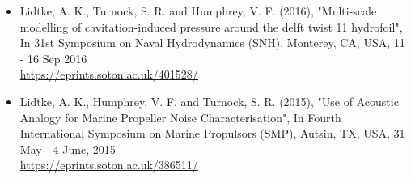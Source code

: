\documentclass[a4paper,10pt]{article}
\begin{document}
\begin{itemize}
%
\item Lidtke, A. K., Turnock, S. R. and Humphrey, V. F. (2016), "Multi-scale modelling
	of cavitation-induced pressure around the delft twist 11 hydrofoil",
	In 31st Symposium on Naval Hydrodynamics (SNH), Monterey, CA, USA, 11 - 16 Sep 2016
	\cite{Lidtke2016b}
	\\ \url{https://eprints.soton.ac.uk/401528/}
%
\item Lidtke, A. K., Humphrey, V. F. and Turnock, S. R. (2015), "Use of Acoustic
	Analogy for Marine Propeller Noise Characterisation", In Fourth International
	Symposium on Marine Propulsors (SMP), Autsin, TX, USA, 31 May - 4 June, 2015
	\cite{Lidtke2015a}
	\\ \url{https://eprints.soton.ac.uk/386511/}
%
\end{itemize}

\end{document}
